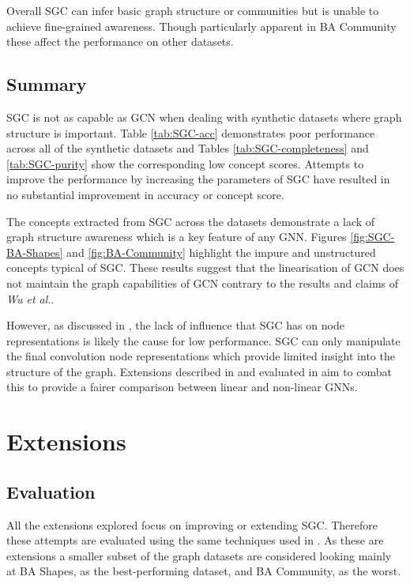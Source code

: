 Overall SGC can infer basic graph structure or communities but is unable to achieve fine-grained awareness.
Though particularly apparent in BA Community these affect the performance on other datasets.

\subsection{Summary}

SGC is not as capable as GCN when dealing with synthetic datasets where graph structure is important.
Table \ref{tab:SGC-acc} demonstrates poor performance across all of the synthetic datasets and Tables \ref{tab:SGC-completeness} and \ref{tab:SGC-purity} show the corresponding low concept scores.
Attempts to improve the performance by increasing the parameters of SGC have resulted in no substantial improvement in accuracy or concept score.

The concepts extracted from SGC across the datasets demonstrate a lack of graph structure awareness which is a key feature of any GNN.
Figures \ref{fig:SGC-BA-Shapes} and \ref{fig:BA-Community} highlight the impure and unstructured concepts typical of SGC.
These results suggest that the linearisation of GCN does not maintain the graph capabilities of GCN contrary to the results and claims of \textit{Wu et al.}.

However, as discussed in , the lack of influence that SGC has on node representations is likely the cause for low performance.
SGC can only manipulate the final convolution node representations which provide limited insight into the structure of the graph.
Extensions described in  and evaluated in  aim to combat this to provide a fairer comparison between linear and non-linear GNNs.

\section{Extensions}
\label{sec:extension-eval}
\subsection{Evaluation}
All the extensions explored focus on improving or extending SGC.
Therefore these attempts are evaluated using the same techniques used in .
As these are extensions a smaller subset of the graph datasets are considered looking mainly at BA Shapes, as the best-performing dataset, and BA Community, as the worst.

